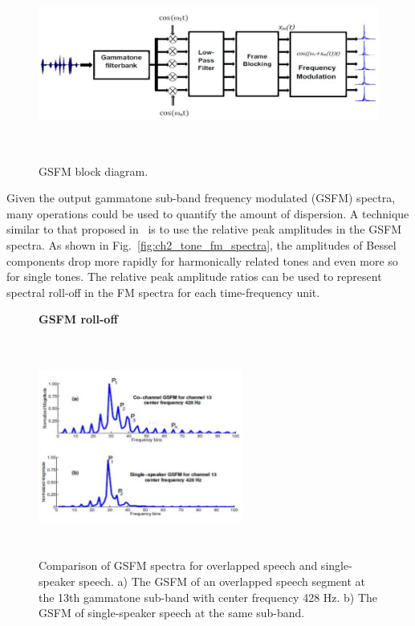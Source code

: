 {\begin{figure}[t!]
	\centering
	\hspace{-1mm}
	\includegraphics[height = 2.5in, width=1\textwidth]{figures/gsfm_block_diagram}
	\vspace{-1mm}
	\caption{ GSFM block diagram.}
	\vspace{0mm}
	\label{fig:ch2_gsfm_block_diagram}
\end{figure}

Given the output gammatone sub-band frequency modulated (GSFM) spectra, many operations could be used to quantify the amount of dispersion. 
A technique similar to that proposed in~\cite{sapvr_2000} is to use the relative peak amplitudes in the GSFM spectra. 
As shown in Fig.~\ref{fig:ch2_tone_fm_spectra}, the amplitudes of Bessel components drop
more rapidly for harmonically related tones and even more so for single tones. 
The relative peak amplitude ratios can be used to represent spectral roll-off in the FM spectra for each time-frequency unit. 

\begin{figure}[h!]
	\centering
	\hspace{-1mm}
	\textbf{GSFM roll-off}\par\medskip
	\includegraphics[height = 2.8in, width=0.6\textwidth]{figures/gsfm_rolloff}
	\vspace{-1mm}
	\caption{ Comparison of GSFM spectra for overlapped speech and single-speaker speech. a) The GSFM of an overlapped speech segment at the 13th gammatone sub-band with center frequency 428 Hz. b) The GSFM of single-speaker speech at the same sub-band.}
	\vspace{0mm}
	\label{fig:ch2_gsfm_rolloff}
\end{figure}

}
